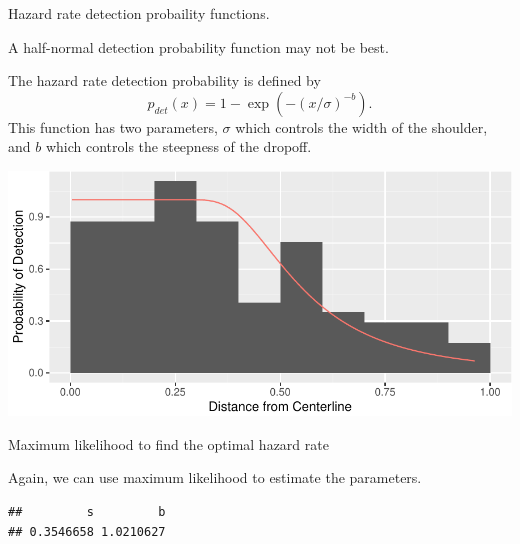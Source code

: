 \documentclass[
  ignorenonframetext,
]{beamer}
\newenvironment{Shaded}{\begin{snugshade}}{\end{snugshade}}
\newcommand{\ControlFlowTok}[1]{\textcolor[rgb]{0.13,0.29,0.53}{\textbf{#1}}}
\newcommand{\DataTypeTok}[1]{\textcolor[rgb]{0.13,0.29,0.53}{#1}}
\newcommand{\DecValTok}[1]{\textcolor[rgb]{0.00,0.00,0.81}{#1}}
\newcommand{\FloatTok}[1]{\textcolor[rgb]{0.00,0.00,0.81}{#1}}
\newcommand{\KeywordTok}[1]{\textcolor[rgb]{0.13,0.29,0.53}{\textbf{#1}}}
\newcommand{\NormalTok}[1]{#1}
\newcommand{\OperatorTok}[1]{\textcolor[rgb]{0.81,0.36,0.00}{\textbf{#1}}}
\newcommand{\OtherTok}[1]{\textcolor[rgb]{0.56,0.35,0.01}{#1}}
\newcommand{\StringTok}[1]{\textcolor[rgb]{0.31,0.60,0.02}{#1}}
\begin{document}
\begin{frame}{Hazard rate detection probaility functions.}
\protect\hypertarget{hazard-rate-detection-probaility-functions.}{}

A half-normal detection probability function may not be best.

The hazard rate detection probability is defined by \[
p_{det}(x)=1-\exp(-(x/\sigma)^{-b}).
\] This function has two parameters, \(\sigma\) which controls the width
of the shoulder, and \(b\) which controls the steepness of the dropoff.

\includegraphics{distance_sampling_files/figure-beamer/unnamed-chunk-17-1.pdf}

\end{frame}

\begin{frame}[fragile]{Maximum likelihood to find the optimal hazard
rate}
\protect\hypertarget{maximum-likelihood-to-find-the-optimal-hazard-rate}{}

Again, we can use maximum likelihood to estimate the parameters.

\scriptsize

\begin{Shaded}
\end{Shaded}

\begin{verbatim}
##         s         b 
## 0.3546658 1.0210627
\end{verbatim}

\end{frame}
\end{document}

